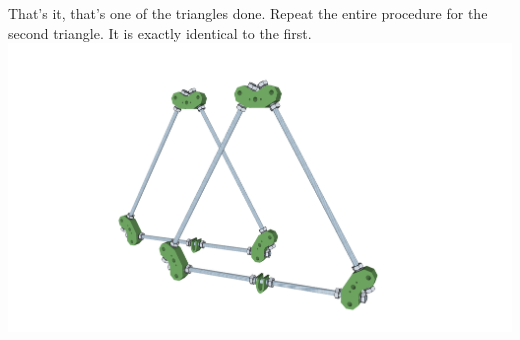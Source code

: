 	\section{}
	That's it, that's one of the triangles done. Repeat the entire procedure for the second triangle. It is
	exactly identical to the first. \\
	\includegraphics[width=1\linewidth]{graphics/ch1_14.png}

